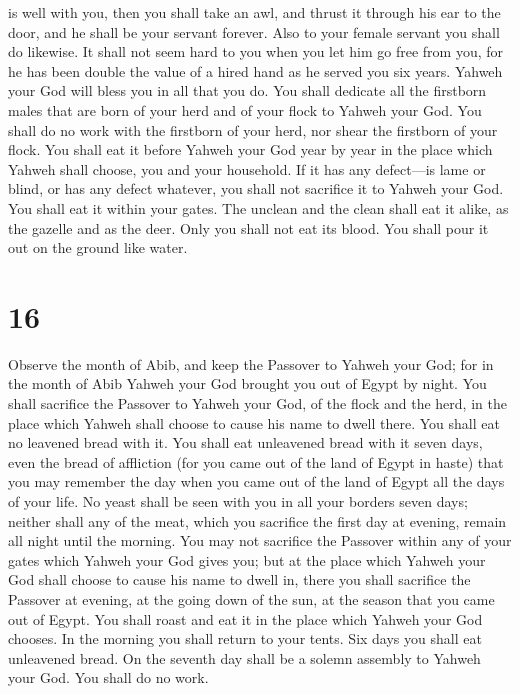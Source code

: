 is well with you,  then you shall take an awl, and thrust
it through his ear to the door, and he shall be your servant forever.
Also to your female servant you shall do likewise.  It
shall not seem hard to you when you let him go free from you, for he has
been double the value of a hired hand as he served you six years. Yahweh
your God will bless you in all that you do.  You shall
dedicate all the firstborn males that are born of your herd and of your
flock to Yahweh your God. You shall do no work with the firstborn of
your herd, nor shear the firstborn of your flock.  You
shall eat it before Yahweh your God year by year in the place which
Yahweh shall choose, you and your household.  If it has
any defect---is lame or blind, or has any defect whatever, you shall not
sacrifice it to Yahweh your God.  You shall eat it within
your gates. The unclean and the clean shall eat it alike, as the gazelle
and as the deer.  Only you shall not eat its blood. You
shall pour it out on the ground like water.

\hypertarget{section-15}{%
\section{16}\label{section-15}}

 Observe the month of Abib, and keep the Passover to
Yahweh your God; for in the month of Abib Yahweh your God brought you
out of Egypt by night.  You shall sacrifice the Passover
to Yahweh your God, of the flock and the herd, in the place which Yahweh
shall choose to cause his name to dwell there.  You shall
eat no leavened bread with it. You shall eat unleavened bread with it
seven days, even the bread of affliction (for you came out of the land
of Egypt in haste) that you may remember the day when you came out of
the land of Egypt all the days of your life.  No yeast
shall be seen with you in all your borders seven days; neither shall any
of the meat, which you sacrifice the first day at evening, remain all
night until the morning.  You may not sacrifice the
Passover within any of your gates which Yahweh your God gives you;
 but at the place which Yahweh your God shall choose to
cause his name to dwell in, there you shall sacrifice the Passover at
evening, at the going down of the sun, at the season that you came out
of Egypt.  You shall roast and eat it in the place which
Yahweh your God chooses. In the morning you shall return to your tents.
 Six days you shall eat unleavened bread. On the seventh
day shall be a solemn assembly to Yahweh your God. You shall do no work.

